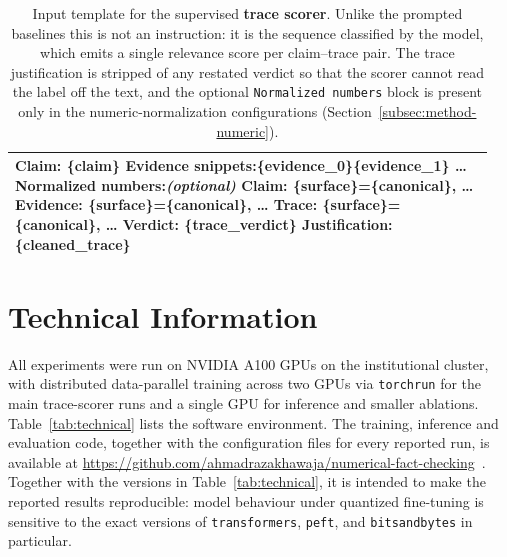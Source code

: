\begin{table}[htbp]
\centering\small
\begin{tabular}{@{}p{0.95\linewidth}@{}}
\toprule
{\ttfamily\scriptsize
Claim: \{claim\}\newline
Evidence snippets:\newline
[0] \{evidence\_0\}\newline
[1] \{evidence\_1\} \ldots\newline
Normalized numbers:\hfill\textnormal{\itshape (optional)}\newline
Claim: \{surface\}=\{canonical\}, \ldots\newline
Evidence: \{surface\}=\{canonical\}, \ldots\newline
Trace: \{surface\}=\{canonical\}, \ldots\newline
Verdict: \{trace\_verdict\}\newline
Justification: \{cleaned\_trace\}
} \\
\bottomrule
\end{tabular}
\caption{Input template for the supervised \textbf{trace scorer}. Unlike the prompted baselines this
is not an instruction: it is the sequence classified by the model, which emits a single relevance
score per claim--trace pair. The trace justification is stripped of any restated verdict so that the
scorer cannot read the label off the text, and the optional \texttt{Normalized numbers} block is
present only in the numeric-normalization configurations
(Section~\ref{subsec:method-numeric}).}
\label{tab:prompt-scorer}

\end{table}

\clearpage
\section{Technical Information}
\label{app:technical}

All experiments were run on NVIDIA A100 GPUs on the institutional cluster, with distributed
data-parallel training across two GPUs via \texttt{torchrun} for the main trace-scorer runs and a
single GPU for inference and smaller ablations. Table~\ref{tab:technical} lists the software
environment. The training, inference and evaluation code, together with the configuration files for
every reported run, is available at
\url{https://github.com/ahmadrazakhawaja/numerical-fact-checking}~\cite{thesisrepo}. Together with
the versions in Table~\ref{tab:technical}, it is intended to make the reported results reproducible:
model behaviour under quantized fine-tuning is sensitive to the exact versions of
\texttt{transformers}, \texttt{peft}, and \texttt{bitsandbytes} in particular.

